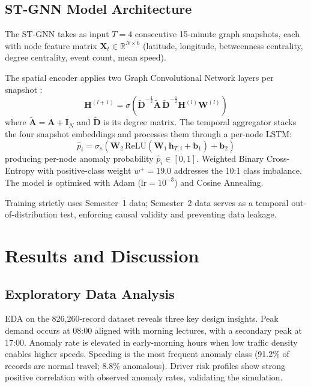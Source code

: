 \documentclass[conference]{IEEEtran}
\begin{document}
\subsection{ST-GNN Model Architecture}

The ST-GNN takes as input $T=4$ consecutive 15-minute graph
snapshots, each with node feature matrix
$\mathbf{X}_t \in \mathbb{R}^{N \times 6}$ (latitude, longitude,
betweenness centrality, degree centrality, event count, mean speed).

The spatial encoder applies two Graph Convolutional Network layers
per snapshot \cite{kipf2017}:
\begin{equation}
\mathbf{H}^{(l+1)} = \sigma\!\left(
  \tilde{\mathbf{D}}^{-\frac{1}{2}}
  \tilde{\mathbf{A}}\,
  \tilde{\mathbf{D}}^{-\frac{1}{2}}
  \mathbf{H}^{(l)}\mathbf{W}^{(l)}
\right)
\end{equation}
where $\tilde{\mathbf{A}} = \mathbf{A} + \mathbf{I}_N$ and
$\tilde{\mathbf{D}}$ is its degree matrix. The temporal aggregator
stacks the four snapshot embeddings and processes them through a
per-node LSTM:
\begin{equation}
\hat{p}_i = \sigma_s\!\left(
  \mathbf{W}_2\,\text{ReLU}(\mathbf{W}_1\,\mathbf{h}_{T,i}
  +\mathbf{b}_1)+\mathbf{b}_2\right)
\end{equation}
producing per-node anomaly probability $\hat{p}_i \in [0,1]$.
Weighted Binary Cross-Entropy with positive-class weight
$w^{+}=19.0$ addresses the 10:1 class imbalance. The model is
optimised with Adam ($\text{lr}=10^{-3}$) and Cosine Annealing.

Training strictly uses Semester~1 data; Semester~2 data serves as a
temporal out-of-distribution test, enforcing causal validity and
preventing data leakage.


\section{Results and Discussion}

\subsection{Exploratory Data Analysis}

EDA on the 826,260-record dataset reveals three key design insights.
Peak demand occurs at 08:00 aligned with morning lectures, with a
secondary peak at 17:00. Anomaly rate is elevated in early-morning
hours when low traffic density enables higher speeds. Speeding is
the most frequent anomaly class (91.2\% of records are normal
travel; 8.8\% anomalous). Driver risk profiles show strong positive
correlation with observed anomaly rates, validating the simulation.
\end{document}

